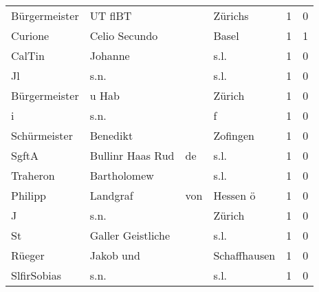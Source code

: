 \begin{center}
\begin{tiny}
\begin{longtabu}{llllrr}
            Bürgermeister &                            UT flBT &             &                                     Zürichs &          1 &         0 \\
                  Curione &                      Celio Secundo &             &                                       Basel &          1 &         1 \\
                   CalTin &                            Johanne &             &                                        s.l. &          1 &         0 \\
                       Jl &                               s.n. &             &                                        s.l. &          1 &         0 \\
            Bürgermeister &                              u Hab &             &                                      Zürich &          1 &         0 \\
                        i &                               s.n. &             &                                           f &          1 &         0 \\
             Schürmeister &                           Benedikt &             &                                    Zofingen &          1 &         0 \\
                    SgftA &                   Bullinr Haas Rud &          de &                                        s.l. &          1 &         0 \\
                 Traheron &                        Bartholomew &             &                                        s.l. &          1 &         0 \\
                  Philipp &                           Landgraf &         von &                                    Hessen ö &          1 &         0 \\
                        J &                               s.n. &             &                                      Zürich &          1 &         0 \\
                       St &                  Galler Geistliche &             &                                        s.l. &          1 &         0 \\
                   Rüeger &                          Jakob und &             &                                Schaffhausen &          1 &         0 \\
              SlfirSobias &                               s.n. &             &                                        s.l. &          1 &         0 \\

\end{longtabu}
\end{tiny}
\end{center}
